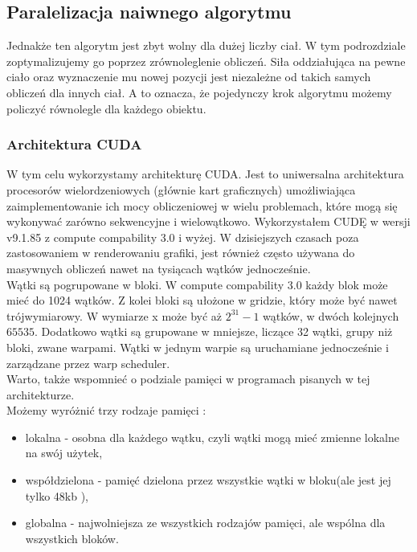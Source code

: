\documentclass[14pt,twoside,a4paper]{article}
\begin{document}
\bigskip

\subsection{\Large Paralelizacja naiwnego algorytmu}

Jednakże ten algorytm jest zbyt wolny dla dużej liczby ciał. W tym podrozdziale zoptymalizujemy go poprzez zrównoleglenie obliczeń. Siła oddziałująca na pewne ciało oraz wyznaczenie mu nowej pozycji jest niezależne od takich samych obliczeń dla innych ciał. A to oznacza, że pojedynczy krok algorytmu możemy policzyć równolegle dla każdego obiektu.

\subsubsection{\large Architektura CUDA}
W tym celu wykorzystamy architekturę CUDA. 
Jest to uniwersalna architektura procesorów wielordzeniowych (głównie kart graficznych) umożliwiająca zaimplementowanie ich mocy obliczeniowej w wielu problemach, które mogą się wykonywać zarówno sekwencyjne i wielowątkowo. Wykorzystałem CUDĘ w wersji v9.1.85 z compute compability 3.0 i wyżej. W dzisiejszych czasach poza zastosowaniem w renderowaniu grafiki, jest również często używana do masywnych obliczeń nawet na tysiącach wątków jednocześnie. \\
Wątki są pogrupowane w bloki. W compute compability 3.0 każdy blok może mieć do 1024 wątków. Z kolei bloki są ułożone w gridzie, który może być nawet trójwymiarowy. W wymiarze x może być aż $2^{31}-1$ wątków, w dwóch kolejnych $65535$. \cite{Cuda}  Dodatkowo wątki są grupowane w mniejsze, liczące 32 wątki, grupy niż bloki, zwane warpami. Wątki w jednym warpie są uruchamiane jednocześnie i zarządzane przez warp scheduler. \cite{Cuda} \\
\bigskip
Warto, także wspomnieć o podziale pamięci w programach pisanych w tej architekturze. \\Możemy wyróżnić trzy rodzaje pamięci :
\begin{itemize}
  \item lokalna - osobna dla każdego wątku, czyli wątki mogą mieć zmienne lokalne na swój użytek,
  \item współdzielona - pamięć dzielona przez wszystkie wątki w bloku(ale jest jej tylko 48kb \cite{Cuda}),
  \item globalna - najwolniejsza ze wszystkich rodzajów pamięci, ale wspólna dla wszystkich bloków.
\end{itemize}
\end{document}
